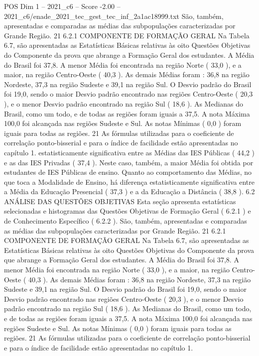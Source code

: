 \begin{textsample}{POS Dim 1 – 2021\_c6 – Score -2.00 – 2021\_c6/enade\_2021\_tec\_gest\_tec\_inf\_2a1ac18999.txt}
São, também, apresentadas e comparadas as médias das subpopulações caracterizadas por Grande Região. 21 6.2.1 COMPONENTE DE FORMAÇÃO GERAL Na Tabela 6.7, são apresentadas as Estatísticas Básicas relativas às oito Questões Objetivas do Componente da prova que abrange a Formação Geral dos estudantes.
A Média do Brasil foi 37,8.
A menor Média foi encontrada na região Norte ( 33,0 ), e a maior, na região Centro-Oeste ( 40,3 ).
As demais Médias foram : 36,8 na região Nordeste, 37,3 na região Sudeste e 39,1 na região Sul.
O Desvio padrão do Brasil foi 19,0, sendo o maior Desvio padrão encontrado nas regiões Centro-Oeste ( 20,3 ), e o menor Desvio padrão encontrado na região Sul ( 18,6 ).
As Medianas do Brasil, como um todo, e de todas as regiões foram iguais a 37,5.
A nota Máxima 100,0 foi alcançada nas regiões Sudeste e Sul.
As notas Mínimas ( 0,0 ) foram iguais para todas as regiões. 21 As fórmulas utilizadas para o coeficiente de correlação ponto-bisserial e para o índice de facilidade estão apresentadas no capítulo 1. estatisticamente significativa entre as Médias das IES Públicas ( 44,2 ) e as das IES Privadas ( 37,4 ).
Neste caso, também, a maior Média foi obtida por estudantes de IES Públicas de ensino.
Quanto ao comportamento das Médias, no que toca a Modalidade de Ensino, há diferença estatisticamente significativa entre a Média da Educação Presencial ( 37,3 ) e a da Educação a Distância ( 38,8 ). 6.2 ANÁLISE DAS QUESTÕES OBJETIVAS Esta seção apresenta estatísticas selecionadas e histogramas das Questões Objetivas de Formação Geral ( 6.2.1 ) e de Conhecimento Específico ( 6.2.2 ).
São, também, apresentadas e comparadas as médias das subpopulações caracterizadas por Grande Região. 21 6.2.1 COMPONENTE DE FORMAÇÃO GERAL Na Tabela 6.7, são apresentadas as Estatísticas Básicas relativas às oito Questões Objetivas do Componente da prova que abrange a Formação Geral dos estudantes.
A Média do Brasil foi 37,8.
A menor Média foi encontrada na região Norte ( 33,0 ), e a maior, na região Centro-Oeste ( 40,3 ).
As demais Médias foram : 36,8 na região Nordeste, 37,3 na região Sudeste e 39,1 na região Sul.
O Desvio padrão do Brasil foi 19,0, sendo o maior Desvio padrão encontrado nas regiões Centro-Oeste ( 20,3 ), e o menor Desvio padrão encontrado na região Sul ( 18,6 ).
As Medianas do Brasil, como um todo, e de todas as regiões foram iguais a 37,5.
A nota Máxima 100,0 foi alcançada nas regiões Sudeste e Sul.
As notas Mínimas ( 0,0 ) foram iguais para todas as regiões. 21 As fórmulas utilizadas para o coeficiente de correlação ponto-bisserial e para o índice de facilidade estão apresentadas no capítulo 1.

\end{textsample}
